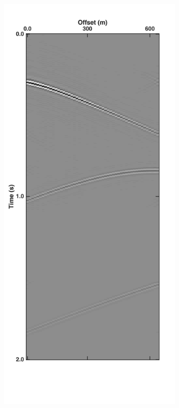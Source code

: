 \begin{figure}
	\centering
	\begin{subfigure}[t]{0.24\textwidth}
		\centering
		\includegraphics[height = 0.38\textheight]{Plots/BlendingPatterns/Unblended_inline10}

\end{subfigure}
\end{figure}
